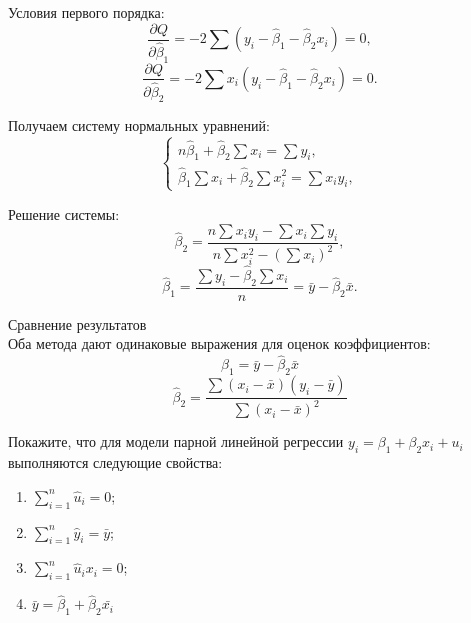 \documentclass[12pt]{article}
\newcommand{\hb}{\hat{\beta}}
\newcommand{\hu}{\hat{u}}
\newcommand{\hy}{\hat{y}}
\begin{document}
\begin{sol}
\begin{enumerate}
Условия первого порядка:
\[
\frac{\partial Q}{\partial \hat{\beta}_1} = -2\sum (y_i - \hat{\beta}_1 - \hat{\beta}_2 x_i) = 0,
\]
\[
\frac{\partial Q}{\partial \hat{\beta}_2} = -2\sum x_i(y_i - \hat{\beta}_1 - \hat{\beta}_2 x_i) = 0.
\]

Получаем систему нормальных уравнений:
\[
\begin{cases}
n\hat{\beta}_1 + \hat{\beta}_2\sum x_i = \sum y_i, \\
\hat{\beta}_1\sum x_i + \hat{\beta}_2\sum x_i^2 = \sum x_i y_i,
\end{cases}
\]

Решение системы:
\[
\hat{\beta}_2 = \frac{n\sum x_i y_i - \sum x_i \sum y_i}{n\sum x_i^2 - (\sum x_i)^2},
\]
\[
\hat{\beta}_1 = \frac{\sum y_i - \hat{\beta}_2 \sum x_i}{n} = \bar{y} - \hat{\beta}_2 \bar{x}.
\]

Сравнение результатов\\

Оба метода дают одинаковые выражения для оценок коэффициентов:
\[
\hat{\beta}_1 = \bar{y} - \hat{\beta}_2 \bar{x}
\]
\[
\hat{\beta}_2 = \frac{\sum (x_i - \bar{x})(y_i - \bar{y})}{\sum (x_i - \bar{x})^2}
\]
\end{enumerate}
\end{sol}

\begin{problem}
    Покажите, что для модели парной линейной регрессии  $y_i = \beta_1 + \beta_2 x_i + u_i$  выполняются следующие свойства:
    \label{task:2lin}
    \begin{enumerate}
        \item $\sum^n_{i=1} \hu_i = 0$;
        \item $\sum^n_{i=1} \hy_i = \bar{y}$;
        \item $\sum^n_{i=1} \hu_i x_i = 0$;
        \item $\bar{y} = \hb_1 + \hb_2 \bar{x_i}$
    \end{enumerate}
\end{problem}
\end{document}
